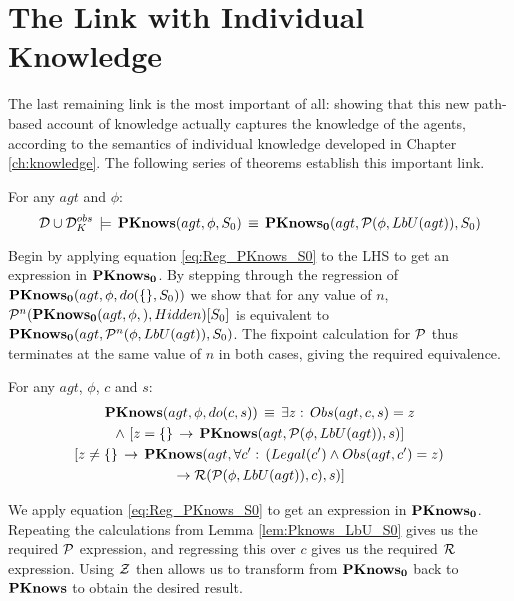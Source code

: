 \section{The Link with Individual Knowledge\label{sec:CKnowledge:Correctness}}

The last remaining link is the most important of all: showing that
this new path-based account of knowledge actually captures the knowledge
of the agents, according to the semantics of individual knowledge
developed in Chapter \ref{ch:knowledge}. The following series of
theorems establish this important link.

\begin{lemma}
\label{lem:Pknows_LbU_S0}For any $agt$ and $\phi$:\[
\mathcal{D}\cup\mathcal{D}_{K}^{obs}\,\models\,\mathbf{PKnows}(agt,\phi,S_{0})\,\equiv\,\mathbf{PKnows_{0}}(agt,\mathcal{P}(\phi,LbU(agt)),S_{0})\]

\end{lemma}
\begin{proofsketch}
Begin by applying equation \eqref{eq:Reg_PKnows_S0} to the LHS to
get an expression in $\mathbf{PKnows_{0}}$. By stepping through the regression
of $\mathbf{PKnows_{0}}(agt,\phi,do(\{\},S_{0}))$ we show that for any value
of $n$, $\mathcal{P}^{n}(\mathbf{PKnows_{0}}(agt,\phi,),Hidden)[S_{0}]$ is equivalent
to $\mathbf{PKnows_{0}}(agt,\mathcal{P}^{n}(\phi,LbU(agt)),S_{0})$. The fixpoint calculation
for $\mathcal{P}$ thus terminates at the same value of $n$ in both cases,
giving the required equivalence. 
\end{proofsketch}
\begin{lemma}
\label{lem:Pknows_LbU_do}For any $agt$, $\phi$, $c$ and $s$:\begin{multline*}
\mathbf{PKnows}(agt,\phi,do(c,s))\,\equiv\,\exists z:\, Obs(agt,c,s)=z\\
\wedge\,\left[z=\{\}\,\rightarrow\,\mathbf{PKnows}(agt,\mathcal{P}(\phi,LbU(agt)),s)\right]\\
\left[z\neq\{\}\,\rightarrow\,\mathbf{PKnows}(agt,\forall c':\,\left(Legal(c')\wedge Obs(agt,c')=z\right)\right.\\
\left.\rightarrow\mathcal{R}(\mathcal{P}(\phi,LbU(agt)),c),s)\right]\end{multline*}

\end{lemma}
\begin{proofsketch}
We apply equation \eqref{eq:Reg_PKnows_S0} to get an expression in
$\mathbf{PKnows_{0}}$. Repeating the calculations from Lemma \ref{lem:Pknows_LbU_S0}
gives us the required $\mathcal{P}$ expression, and regressing this over
$c$ gives us the required $\mathcal{R}$ expression. Using $\mathcal{Z}$ then
allows us to transform from $\mathbf{PKnows_{0}}$ back to $\mathbf{PKnows}$ to obtain
the desired result. 
\end{proofsketch}
